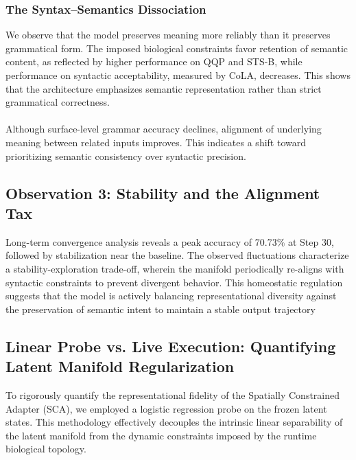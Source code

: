 \documentclass[11pt, letterpaper]{article}
\begin{document}
\subsubsection{The Syntax–Semantics Dissociation}
We observe that the model preserves meaning more reliably than it preserves grammatical form. The imposed biological constraints favor retention of semantic content, as reflected by higher performance on QQP and STS-B, while performance on syntactic acceptability, measured by CoLA, decreases. This shows that the architecture emphasizes semantic representation rather than strict grammatical correctness.

\paragraph{}
Although surface-level grammar accuracy declines, alignment of underlying meaning between related inputs improves. This indicates a shift toward prioritizing semantic consistency over syntactic precision.

\subsection{Observation 3: Stability and the Alignment Tax}
Long-term convergence analysis reveals a peak accuracy of 70.73\% at Step 30, followed by stabilization near the baseline. The observed fluctuations characterize a stability-exploration trade-off, wherein the manifold periodically re-aligns with syntactic constraints to prevent divergent behavior. This homeostatic regulation suggests that the model is actively balancing representational diversity against the preservation of semantic intent to maintain a stable output trajectory

\subsection{Linear Probe vs. Live Execution: Quantifying Latent Manifold Regularization}
To rigorously quantify the representational fidelity of the Spatially Constrained Adapter (SCA), we employed a logistic regression probe on the frozen latent states. This methodology effectively decouples the intrinsic linear separability of the latent manifold from the dynamic constraints imposed by the runtime biological topology.
\end{document}
